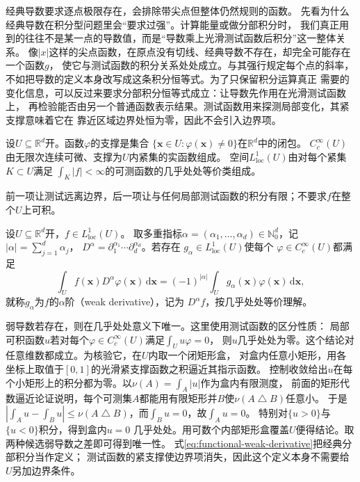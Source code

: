 经典导数要求逐点极限存在，会排除带尖点但整体仍然规则的函数。
先看为什么经典导数在积分型问题里会“要求过强”。计算能量或做分部积分时，
我们真正用到的往往不是某一点的导数值，而是“导数乘上光滑测试函数后积分”这一整体关系。
像$|x|$这样的尖点函数，在原点没有切线、经典导数不存在，却完全可能存在一个函数$g$，
使它与测试函数的积分关系处处成立。与其强行规定每个点的斜率，
不如把导数的定义本身改写成这条积分恒等式。为了只保留积分运算真正
需要的变化信息，可以反过来要求分部积分恒等式成立：让导数先作用在光滑测试函数上，
再检验能否由另一个普通函数表示结果。测试函数用来探测局部变化，其紧支撑意味着它在
靠近区域边界处恒为零，因此不会引入边界项。
\begin{definition}[测试函数与局部可积性]
\label{def:functional-tests-local-integrability}
设$U\subseteq\mathbb R^d$开。函数$\varphi$的支撑是集合
$\{\bm x\in U:\varphi(\bm x)\neq0\}$在$\mathbb R^d$中的闭包。
$C_c^\infty(U)$由无限次连续可微、支撑为$U$内紧集的实函数组成。
空间$L^1_{\mathrm{loc}}(U)$由对每个紧集$K\subset U$满足
$\int_K|f|<\infty$的可测函数的几乎处处等价类组成。
\end{definition}
前一项让测试远离边界，后一项让与任何局部测试函数的积分有限；不要求$f$在整个$U$上可积。
\begin{definition}[弱导数]
\label{def:functional-weak-derivative}
设$U\subseteq\mathbb R^d$开，$f\in L^1_{\mathrm{loc}}(U)$。
取多重指标$\alpha=(\alpha_1,\ldots,\alpha_d)\in\mathbb{N}_0^d$，记
$|\alpha|=\sum_{j=1}^d\alpha_j$，
$D^\alpha=\partial_1^{\alpha_1}\cdots\partial_d^{\alpha_d}$。若存在
$g_\alpha\in L^1_{\mathrm{loc}}(U)$使每个
$\varphi\in C_c^\infty(U)$都满足
\begin{equation}
  \int_U f(\bm{x})D^\alpha\varphi(\bm{x})\,\mathrm{d}\bm{x}
  =
  (-1)^{|\alpha|}
  \int_U g_\alpha(\bm{x})\varphi(\bm{x})\,\mathrm{d}\bm{x},
  \label{eq:functional-weak-derivative}
\end{equation}
就称$g_\alpha$为$f$的$\alpha$阶（weak derivative），记为
$D^\alpha f$，按几乎处处等价理解。
\end{definition}
弱导数若存在，则在几乎处处意义下唯一。这里使用测试函数的区分性质：
局部可积函数$u$若对每个$\varphi\in C_c^\infty(U)$满足$\int_Uu\varphi=0$，
则$u$几乎处处为零。这个结论对任意维数都成立。为核验它，在$U$内取一个闭矩形盒，
对盒内任意小矩形，用各坐标上取值于$[0,1]$的光滑紧支撑函数之积逼近其指示函数。
控制收敛给出$u$在每个小矩形上的积分都为零。以$\nu(A)=\int_A|u|$作为盒内有限测度，
前面的矩形代数逼近论证说明，每个可测集$A$都能用有限矩形并$B$使$\nu(A\mathbin\triangle B)$任意小。
于是$|\int_Au-\int_Bu|\leq\nu(A\mathbin\triangle B)$，而$\int_Bu=0$，故$\int_Au=0$。
特别对$\{u>0\}$与$\{u<0\}$积分，得到盒内$u=0$
几乎处处。用可数个内部矩形盒覆盖$U$便得结论。取两种候选弱导数之差即可得到唯一性。
式\eqref{eq:functional-weak-derivative}把经典分部积分当作定义；
测试函数的紧支撑使边界项消失，因此这个定义本身不需要给$U$另加边界条件。

